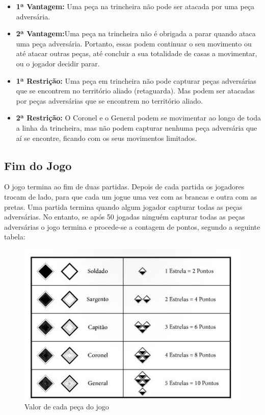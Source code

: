 \documentclass[a4paper]{article}
\begin{document}
\begin{itemize}
	\item \textbf{1ª Vantagem:} Uma peça na trincheira não pode ser atacada por uma peça adversária. 
	\item \textbf{2ª Vantagem:}Uma peça na trincheira não é obrigada a parar quando ataca uma peça adversária. Portanto, essas podem continuar o seu movimento ou até atacar outras peças, até concluir a sua totalidade de casas a movimentar, ou o jogador decidir parar.

	\item \textbf{1ª Restrição:} Uma peça em trincheira não pode capturar peças adversárias que se encontrem no território aliado (retaguarda). Mas podem ser atacadas por peças adversárias que se encontrem no território aliado. 
	\item \textbf{2ª Restrição:} O Coronel e o General podem se movimentar ao longo de toda a linha da trincheira, mas não podem capturar nenhuma peça adversária que aí se encontre, ficando com os seus movimentos limitados.
\end{itemize}

\newpage

\subsection{Fim do Jogo}

O jogo termina ao fim de duas partidas. Depois de cada partida os jogadores trocam de lado, para que cada um jogue uma vez com as brancas e outra com as pretas. 
	Uma partida termina quando algum jogador capturar todas as peças adversárias. No entanto, se após 50 jogadas ninguém capturar todas as peças adversárias o jogo termina e procede-se a contagem de pontos, segundo a seguinte tabela:

\begin{figure}[h!]
\begin{center}
\includegraphics[scale=0.7]{img/points.jpg}
\caption{Valor de cada peça do jogo}
\label{fig:6}
\end{center}
\end{figure}
\end{document}
